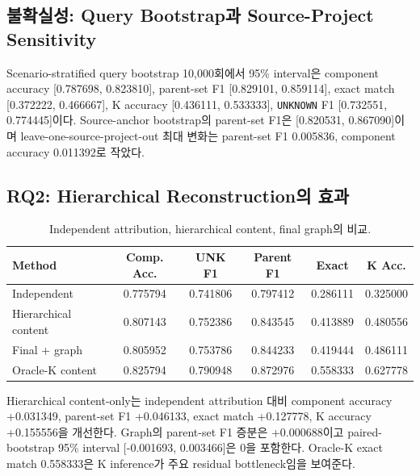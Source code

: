 \documentclass[runningheads]{llncs}
\begin{document}
\subsection{불확실성: Query Bootstrap과 Source-Project Sensitivity}
Scenario-stratified query bootstrap 10,000회에서 95\% interval은 component accuracy [0.787698, 0.823810], parent-set F1 [0.829101, 0.859114], exact match [0.372222, 0.466667], K accuracy [0.436111, 0.533333], \texttt{UNKNOWN} F1 [0.732551, 0.774445]이다. Source-anchor bootstrap의 parent-set F1은 [0.820531, 0.867090]이며 leave-one-source-project-out 최대 변화는 parent-set F1 0.005836, component accuracy 0.011392로 작았다.

\subsection{RQ2: Hierarchical Reconstruction의 효과}
\begin{table}[!htbp]
\centering
\caption{Independent attribution, hierarchical content, final graph의 비교.}
\label{tab:ablation}
\scriptsize
\begin{tabular}{lccccc}
\toprule
Method & Comp. Acc. & UNK F1 & Parent F1 & Exact & K Acc.\\
\midrule
Independent & 0.775794 & 0.741806 & 0.797412 & 0.286111 & 0.325000\\
Hierarchical content & 0.807143 & 0.752386 & 0.843545 & 0.413889 & 0.480556\\
Final + graph & 0.805952 & 0.753786 & 0.844233 & 0.419444 & 0.486111\\
Oracle-K content & 0.825794 & 0.790948 & 0.872976 & 0.558333 & 0.627778\\
\bottomrule
\end{tabular}
\end{table}
Hierarchical content-only는 independent attribution 대비 component accuracy +0.031349, parent-set F1 +0.046133, exact match +0.127778, K accuracy +0.155556을 개선한다. Graph의 parent-set F1 증분은 +0.000688이고 paired-bootstrap 95\% interval [-0.001693, 0.003466]은 0을 포함한다. Oracle-K exact match 0.558333은 K inference가 주요 residual bottleneck임을 보여준다.
\end{document}
